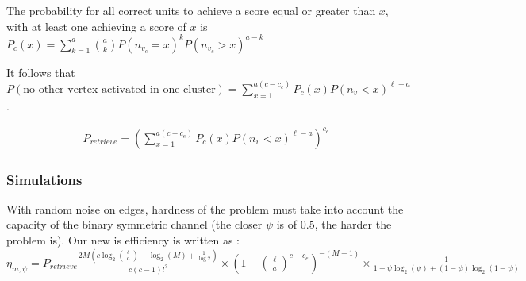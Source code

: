 \documentclass[english,10pt,twocolumn]{IEEEtran}
\theoremstyle{definition}
\begin{document}
	
	The probability for all correct units to achieve a score equal or greater than $x$, with at least one achieving a score of $x$ is $P_c (x) =\sum_{k = 1}^{a} { a \choose k }   P(n_{v_c} = x)^k P(n_{v_c} > x)^{a-k} $

	It follows that $P(\mbox{no other vertex activated in one cluster})= \sum_{x = 1}^{a (c - c_e)} P_c(x) P(n_v < x)^{\ell-a}$.%
	

	\begin{align}
	P_{retrieve}=  \left( \sum_{x = 1}^{a ( c- c_e)} P_c(x) P(n_v < x)^{\ell-a} \right )^{c_e}
	\label{psi_formula_th}
	\end{align}

	\subsubsection{Simulations}
	
	With random noise on edges, hardness of the problem must take into account the capacity of the binary symmetric channel (the closer $\psi$ is of $0.5$, the harder the problem is). Our new is efficiency is written as :  	
	$\eta_{m, \psi} = P_{retrieve}  \frac{2 M \left(c \log_2{\ell \choose a } - \log_2(M) + \frac{1}{\log 2} \right)}{c(c-1)l^2} \times (1-{\ell \choose a}^{c - c_e})^{-(M-1)} \times \frac{1}{1 + \psi \log_2(\psi) +(1-\psi) \log_2(1-\psi)} $
	
\end{document}
